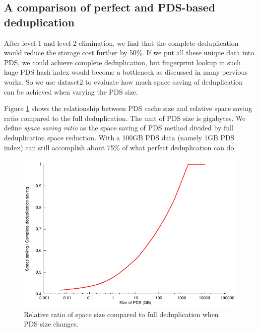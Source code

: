 \subsection{A comparison of perfect and PDS-based deduplication }
After level-1 and level 2 elimination, we find that 
the complete deduplication would reduce the storage cost further by 50\%. 
If we put all these unique data into PDS, 
we could achieve complete deduplication,
but fingerprint lookup in such huge PDS hash index would become a bottleneck as discussed in many pervious works. 
So we use dataset2 to evaluate how much space saving of 
deduplication can be achieved when varying the PDS size.

Figure \ref{fig:datacdssize} shows the relationship between PDS cache size and relative space saving ratio
compared to the full deduplication.  The unit of PDS size is gigabytes.
We define \emph{space saving ratio} as the space saving of PDS method divided by 
full deduplication space reduction. 
With a 100GB PDS data (namely 1GB PDS index) can still  accomplish about 75\% 
of what perfect deduplication can do.

\begin{figure}
  \centering
  \includegraphics[width=5in]{images/uniquedata-saving1.pdf}
  \caption{Relative ratio of space size compared to full deduplication when PDS size changes.}
  \label{fig:datacdssize}
\end{figure}

